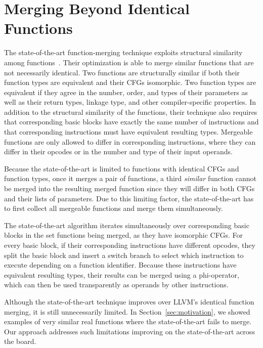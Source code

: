 
\section{Merging Beyond Identical Functions}

The state-of-the-art function-merging technique exploits structural similarity among functions~\cite{edler14}.
Their optimization is able to merge similar functions that are not necessarily
identical.
Two functions are structurally similar if both their function types are equivalent
and their CFGs isomorphic.
Two function types are equivalent if they agree in the number, order, and types
of their parameters as well as
their return types, linkage type, and other compiler-specific properties.
In addition to the structural similarity of the functions, their technique also
requires that corresponding basic blocks have exactly the same number of instructions
and that corresponding instructions must have equivalent resulting types.
Mergeable functions are only allowed to differ in corresponding instructions,
where they can differ in their opcodes or in the number and type of their input operands.


Because the state-of-the-art is limited to functions with identical CFGs
and function types, once it merges a pair of functions, a third
\textit{similar} function cannot be merged into the resulting merged function
since they will differ in both CFGs and their lists of parameters.
Due to this limiting factor, the state-of-the-art has to first collect all
mergeable functions and merge them simultaneously.

The state-of-the-art algorithm iterates simultaneously over corresponding basic
blocks in the set functions being merged, as they have isomorphic CFGs.
For every basic block, if their corresponding instructions have different opcodes,
they split the basic block and insert a switch branch to select which instruction
to execute depending on a function identifier.
Because these instructions have equivalent resulting types, their results can be
merged using a phi-operator, which can then be used transparently as operands
by other instructions.

Although the state-of-the-art technique improves over LLVM's identical function merging, it is
still unnecessarily limited. In Section~\ref{sec:motivation}, we showed examples of very similar
real functions where the state-of-the-art fails to merge. Our approach addresses such limitations
improving on the state-of-the-art across the board.


